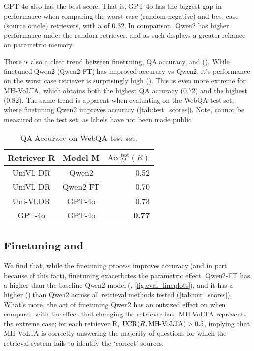 GPT-4o also has the best \PPR score. That is, GPT-4o has the biggest gap in performance when comparing the worst case (random negative) and best case (source oracle) retrievers, with a \PPR of 0.32. In comparison, Qwen2 has higher performance under the random retriever, and as such displays a greater reliance on parametric memory. 

There is also a clear trend between finetuning, QA accuracy, and \ppr (\PPR). While finetuned Qwen2 (Qwen2-FT) has improved accuracy vs Qwen2, it's performance on the worst case retriever is surprisingly high (). This is even more extreme for MH-VoLTA, which obtains both the highest QA accuracy (0.72) and the highest \PPR (0.82). The same trend is apparent when evaluating on the WebQA test set, where finetuning Qwen2 improves accuracy (\autoref{tab:test_scores}). Note, \PPR cannot be measured on the test set, as labels have not been made public.

\begin{table}[]
    \centering
    \caption{QA Accuracy on WebQA test set.}
    \label{tab:test_scores}
    \begin{tabular}{ccr}
    \toprule
Retriever R & Model M & $\text{Acc}^{\text{test}}_M(R)$ \\
\midrule
UniVL-DR & Qwen2 & 0.52 \\
UniVL-DR & Qwen2-FT & 0.70 \\
Uni-VLDR & GPT-4o & 0.73 \\
GPT-4o & GPT-4o & \textbf{0.77} \\ 
\bottomrule
    \end{tabular}
\end{table}




\subsection{Finetuning and \UCR}
We find that, while the finetuning process improves accuracy (and in part because of this fact), finetuning exacerbates the parametric effect. Qwen2-FT has a higher \ppr than the baseline Qwen2 model (\PPR, \autoref{fig:eval_lineplots}), and it has a higher \ucr (\UCR) than Qwen2 across all retrieval methods tested (\autoref{tab:ucr_scores}). What's more, the act of finetuning Qwen2 has an outsized effect on \UCR when compared with the effect that changing the retriever has. MH-VoLTA represents the extreme case; for each retriever R, $\text{UCR}(R,\text{MH-VoLTA})>0.5$, implying that MH-VoLTA is correctly answering the majority of questions for which the retrieval system fails to identify the `correct' sources. 

